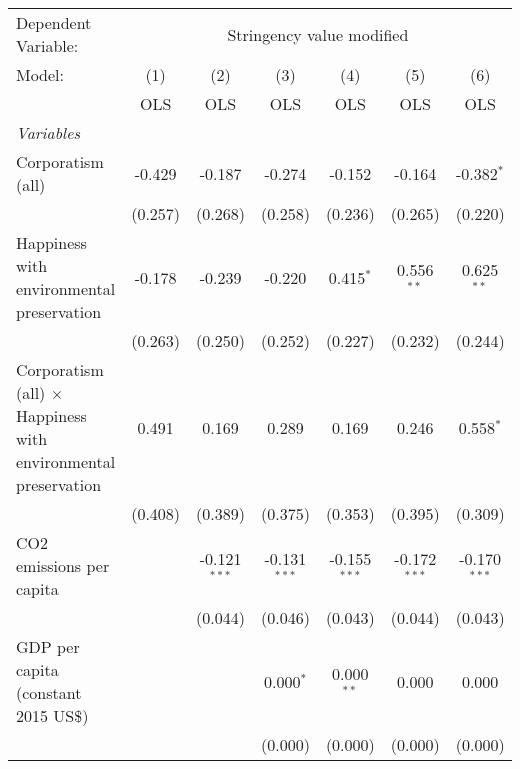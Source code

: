 
\begingroup
\centering
\begin{tabular}{lcccccc}
   \toprule
   Dependent Variable: & \multicolumn{6}{c}{Stringency value modified}\\
   Model:                                                                & (1)     & (2)            & (3)            & (4)            & (5)            & (6)\\  
                                                                         &  OLS    & OLS            & OLS            & OLS            & OLS            & OLS\\  
   \midrule
   \emph{Variables}\\
   Corporatism (all)                                                     & -0.429  & -0.187         & -0.274         & -0.152         & -0.164         & -0.382$^{*}$\\   
                                                                         & (0.257) & (0.268)        & (0.258)        & (0.236)        & (0.265)        & (0.220)\\   
   Happiness with environmental preservation                             & -0.178  & -0.239         & -0.220         & 0.415$^{*}$    & 0.556$^{**}$   & 0.625$^{**}$\\   
                                                                         & (0.263) & (0.250)        & (0.252)        & (0.227)        & (0.232)        & (0.244)\\   
   Corporatism (all) $\times$ Happiness with environmental preservation  & 0.491   & 0.169          & 0.289          & 0.169          & 0.246          & 0.558$^{*}$\\   
                                                                         & (0.408) & (0.389)        & (0.375)        & (0.353)        & (0.395)        & (0.309)\\   
   CO2 emissions per capita                                              &         & -0.121$^{***}$ & -0.131$^{***}$ & -0.155$^{***}$ & -0.172$^{***}$ & -0.170$^{***}$\\   
                                                                         &         & (0.044)        & (0.046)        & (0.043)        & (0.044)        & (0.043)\\   
   GDP per capita (constant 2015 US\$)                                   &         &                & 0.000$^{*}$    & 0.000$^{**}$   & 0.000          & 0.000\\   
                                                                         &         &                & (0.000)        & (0.000)        & (0.000)        & (0.000)\\   

\end{tabular}
